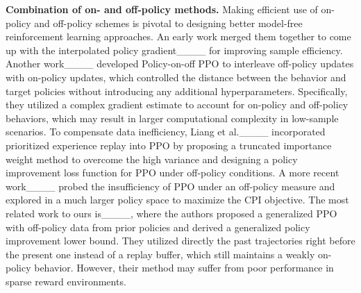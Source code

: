 \textbf{Combination of on- and off-policy methods.} Making efficient use of on-policy and off-policy schemes is pivotal to designing better model-free reinforcement learning approaches. An early work merged them together to come up with the interpolated policy gradient____ for improving sample efficiency. Another work____ developed Policy-on-off PPO to interleave off-policy updates with on-policy updates, which controlled the distance between the behavior and target policies without introducing any additional hyperparameters. Specifically, they utilized a complex gradient estimate to account for on-policy and off-policy behaviors, which may result in larger computational complexity in low-sample scenarios.
To compensate data inefficiency, Liang et al.____ incorporated prioritized experience replay into PPO by proposing a truncated importance weight method to overcome the high variance and designing a policy improvement loss function for PPO under off-policy conditions. A more recent work____ probed the insufficiency of PPO under an off-policy measure and explored in a much larger policy space to maximize the CPI objective.
The most related work to ours is____, where the authors proposed a generalized PPO with off-policy data from prior policies and derived a generalized policy improvement lower bound. They utilized directly the past trajectories right before the present one instead of a replay buffer, which still maintains a weakly on-policy behavior. However, their method may suffer from poor performance in sparse reward environments.